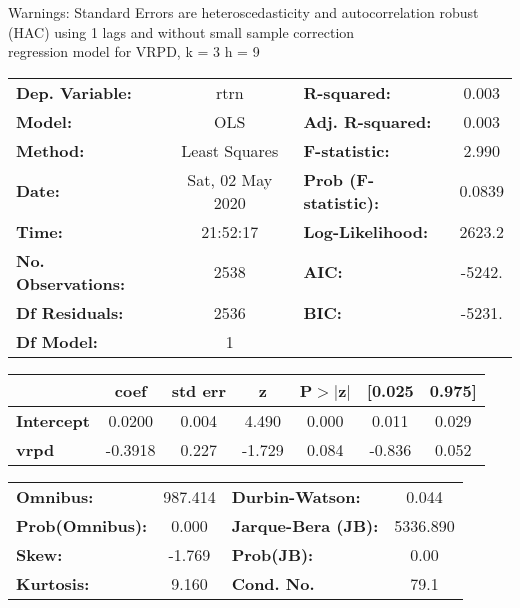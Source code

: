 Warnings: \newline
 [1] Standard Errors are heteroscedasticity and autocorrelation robust (HAC) using 1 lags and without small sample correction\\ 

regression model for VRPD, k = 3 h = 9\begin{center}
\begin{tabular}{lclc}
\toprule
\textbf{Dep. Variable:}    &       rtrn       & \textbf{  R-squared:         } &     0.003   \\
\textbf{Model:}            &       OLS        & \textbf{  Adj. R-squared:    } &     0.003   \\
\textbf{Method:}           &  Least Squares   & \textbf{  F-statistic:       } &     2.990   \\
\textbf{Date:}             & Sat, 02 May 2020 & \textbf{  Prob (F-statistic):} &   0.0839    \\
\textbf{Time:}             &     21:52:17     & \textbf{  Log-Likelihood:    } &    2623.2   \\
\textbf{No. Observations:} &        2538      & \textbf{  AIC:               } &    -5242.   \\
\textbf{Df Residuals:}     &        2536      & \textbf{  BIC:               } &    -5231.   \\
\textbf{Df Model:}         &           1      & \textbf{                     } &             \\
\bottomrule
\end{tabular}
\begin{tabular}{lcccccc}
                   & \textbf{coef} & \textbf{std err} & \textbf{z} & \textbf{P$> |$z$|$} & \textbf{[0.025} & \textbf{0.975]}  \\
\midrule
\textbf{Intercept} &       0.0200  &        0.004     &     4.490  &         0.000        &        0.011    &        0.029     \\
\textbf{vrpd}      &      -0.3918  &        0.227     &    -1.729  &         0.084        &       -0.836    &        0.052     \\
\bottomrule
\end{tabular}
\begin{tabular}{lclc}
\textbf{Omnibus:}       & 987.414 & \textbf{  Durbin-Watson:     } &    0.044  \\
\textbf{Prob(Omnibus):} &   0.000 & \textbf{  Jarque-Bera (JB):  } & 5336.890  \\
\textbf{Skew:}          &  -1.769 & \textbf{  Prob(JB):          } &     0.00  \\
\textbf{Kurtosis:}      &   9.160 & \textbf{  Cond. No.          } &     79.1  \\
\bottomrule
\end{tabular}
\end{center}

